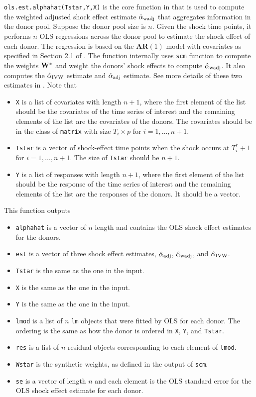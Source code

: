 \documentclass[12pt]{article}
\begin{document}
 \texttt{ols.est.alphahat(Tstar,Y,X)} is the core function in  that is used to compute the weighted adjusted shock effect estimate $\hat{\alpha}_{\rm wadj}$ that aggregates information in the donor pool. Suppose the donor pool size is $n$. Given the shock time points, it performs $n$ OLS regressions across the donor pool to estimate the shock effect of each donor. The regression is based on the $\textbf{AR}(1)$ model with covariates as specified in Section 2.1 of .  The function internally uses \texttt{scm} function to compute the weights $\mathbf{W}^*$ and weight the donors' shock effects to compute $\hat{\alpha}_{\rm wadj}$. It also computes the $\hat{\alpha}_{\rm IVW}$ estimate and $\hat{\alpha}_{\rm adj}$ estimate. See more details of these two estimates in . Note that
\begin{itemize}
	\item \texttt{X} is a list of covariates with length $n+1$, where the first element of the list should be the covariates of the time series of interest and the remaining elements of the list are the covariates of the donors. The covariates should be in the class of \texttt{matrix} with size $T_i\times p$ for $i = 1, \ldots, n+1$.
	\item \texttt{Tstar} is a vector of shock-effect time points when the shock occurs at $T^*_i+1$ for $i = 1, \ldots, n+1$. The size of \texttt{Tstar} should be $n+1$.
	\item \texttt{Y} is a list of responses with length $n +1$,  where the first element of the list should be the response of the time series of interest and the remaining elements of the list are the responses of the donors. It should be a vector.
\end{itemize}
 
 This function outputs
 \begin{itemize}
 	\item \texttt{alphahat} is a vector of $n$ length and contains the OLS shock effect estimates for the donors.
 	\item \texttt{est} is a vector of three shock effect estimates, $\hat{\alpha}_{\rm adj}$, $\hat{\alpha}_{\rm wadj}$, and $\hat{\alpha}_{\rm IVW}$.
 	\item \texttt{Tstar} is the same as the one in the input.
 	\item \texttt{X} is the same as the one in the input.
 	\item \texttt{Y} is the same as the one in the input.
 	\item \texttt{lmod} is a list of $n$ \texttt{lm} objects that were fitted by OLS for each donor. The ordering is the same as how the donor is ordered in \texttt{X}, \texttt{Y}, and \texttt{Tstar}.
 	\item \texttt{res} is a list of $n$ residual objects corresponding to each element of  \texttt{lmod}.
 	\item \texttt{Wstar} is the synthetic weights, as defined in the output of \texttt{scm}.
 	\item \texttt{se} is a vector of length $n$ and each element is the OLS standard error for the OLS shock effect estimate for each donor.
 \end{itemize}
 
\end{document}
